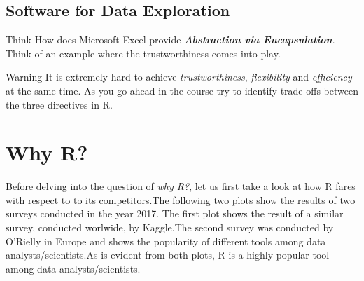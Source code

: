 \subsection{Software for Data Exploration}
\begin{HIGHLIGHT}
\par{}
\end{HIGHLIGHT}

\begin{DIY}{Think}
How does Microsoft Excel provide \textbf{\emph{Abstraction via Encapsulation}}. Think of an example where the trustworthiness comes into play.
\end{DIY}

\begin{DIY}{Warning}
It is extremely hard to achieve \emph{trustworthiness}, \emph{flexibility} and \emph{efficiency} at the same time. As you go ahead in the course try to identify trade-offs between the three directives in R.  
\end{DIY}


\newpage

\section{Why R?}
\noindent Before delving into the question of \emph{why R?}, let us first take a look at how R fares with respect to to its competitors.The following two plots show the results of two surveys conducted in the year 2017. The first plot shows the result of a similar survey, conducted worlwide, by Kaggle.The second survey was conducted by O'Rielly in Europe and shows the popularity of different tools among data analysts/scientists.As is evident from both plots, R is a highly popular tool among data analysts/scientists.

